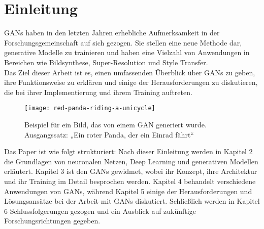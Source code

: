 \chapter{Einleitung}

\noindent \acfp{GAN} haben in den letzten Jahren erhebliche Aufmerksamkeit in der Forschungsgemeinschaft auf sich gezogen. Sie stellen eine neue Methode dar, generative Modelle zu trainieren und haben eine Vielzahl von Anwendungen in Bereichen wie Bildsynthese, Super-Resolution und Style Transfer. \\

\noindent Das Ziel dieser Arbeit ist es, einen umfassenden Überblick über \acp{GAN} zu geben, ihre Funktionsweise zu erklären und einige der Herausforderungen zu diskutieren, die bei ihrer Implementierung und ihrem Training auftreten. \\

\begin{wrapfigure}{l}{0.50\textwidth}
    \centering
    \texttt{[image: red-panda-riding-a-unicycle]}
    \caption{Beispiel für ein Bild, das von einem \ac{GAN} generiert wurde. Ausgangssatz: „Ein roter Panda, der ein Einrad fährt“}
    \label{Abb:basic}
    \end{wrapfigure}

\hfill
\break
Das Paper ist wie folgt strukturiert: Nach dieser Einleitung werden in Kapitel 2 die Grundlagen von neuronalen Netzen, Deep Learning und generativen Modellen erläutert. Kapitel 3 ist den \acp{GAN} gewidmet, wobei ihr Konzept, ihre Architektur und ihr Training im Detail besprochen werden. Kapitel 4 behandelt verschiedene Anwendungen von \acp{GAN}, während Kapitel 5 einige der Herausforderungen und Lösungsansätze bei der Arbeit mit \acp{GAN} diskutiert. Schließlich werden in Kapitel 6 Schlussfolgerungen gezogen und ein Ausblick auf zukünftige Forschungsrichtungen gegeben. \\